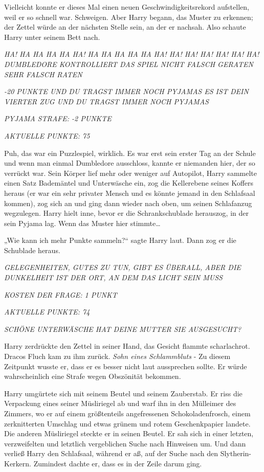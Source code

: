 {Vielleicht konnte er dieses Mal einen neuen Geschwindigkeitsrekord aufstellen, weil er so schnell war. Schweigen. Aber Harry begann, das Muster zu erkennen; der Zettel würde an der nächsten Stelle sein, an der er nachsah. Also schaute Harry unter seinem Bett nach.

\emph{HA! HA HA HA HA HA! HA HA HA HA HA HA! HA! HA! HA! HA! HA! HA! DUMBLEDORE KONTROLLIERT DAS SPIEL NICHT FALSCH GERATEN SEHR FALSCH RATEN}

\emph{-20 PUNKTE UND DU TRAGST IMMER NOCH PYJAMAS ES IST DEIN VIERTER ZUG UND DU TRAGST IMMER NOCH PYJAMAS}

\emph{PYJAMA STRAFE: -2 PUNKTE}

\emph{AKTUELLE PUNKTE: 75}

Puh, das war ein Puzzlespiel, wirklich. Es war erst sein erster Tag an der Schule und wenn man einmal Dumbledore ausschloss, kannte er niemanden hier, der so verrückt war. Sein Körper lief mehr oder weniger auf Autopilot, Harry sammelte einen Satz Bademäntel und Unterwäsche ein, zog die Kellerebene seines Koffers heraus (er war ein sehr privater Mensch und es könnte jemand in den Schlafsaal kommen), zog sich an und ging dann wieder nach oben, um seinen Schlafanzug wegzulegen. Harry hielt inne, bevor er die Schrankschublade herauszog, in der sein Pyjama lag. Wenn das Muster hier stimmte…

„Wie kann ich mehr Punkte sammeln?“ sagte Harry laut. Dann zog er die Schublade heraus.

\emph{GELEGENHEITEN, GUTES ZU TUN, GIBT ES ÜBERALL, ABER DIE DUNKELHEIT IST DER ORT, AN DEM DAS LICHT SEIN MUSS}

\emph{KOSTEN DER FRAGE: 1 PUNKT}

\emph{AKTUELLE PUNKTE: 74}

\emph{SCHÖNE UNTERWÄSCHE HAT DEINE MUTTER SIE AUSGESUCHT?}

Harry zerdrückte den Zettel in seiner Hand, das Gesicht flammte scharlachrot. Dracos Fluch kam zu ihm zurück. \emph{Sohn eines Schlammbluts} - Zu diesem Zeitpunkt wusste er, dass er es besser nicht laut aussprechen sollte. Er würde wahrscheinlich eine Strafe wegen Obszönität bekommen.

Harry umgürtete sich mit seinem Beutel und seinem Zauberstab. Er riss die Verpackung eines seiner Müsliriegel ab und warf ihn in den Mülleimer des Zimmers, wo er auf einem größtenteils angefressenen Schokoladenfrosch, einem zerknitterten Umschlag und etwas grünem und rotem Geschenkpapier landete. Die anderen Müsliriegel steckte er in seinen Beutel. Er sah sich in einer letzten, verzweifelten und letztlich vergeblichen Suche nach Hinweisen um. Und dann verließ Harry den Schlafsaal, während er aß, auf der Suche nach den Slytherin-Kerkern. Zumindest dachte er, dass es in der Zeile darum ging.

}
